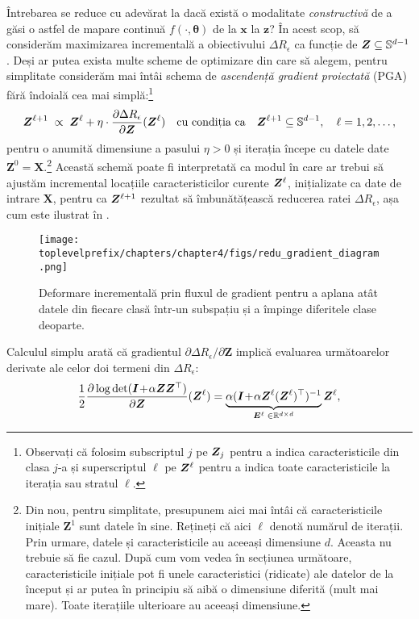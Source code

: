\documentclass[../../book-main_ro.tex]{subfiles}
\begin{document}
Întrebarea se reduce cu adevărat la dacă există o modalitate {\em constructivă} de a găsi o astfel de mapare continuă $f(\cdot,\bm \theta)$ de la $\bm x$ la $\bm z$? În acest scop, să considerăm maximizarea incrementală a obiectivului $\Delta R_{\epsilon}$ ca funcție de $\bm{Z} \subseteq \mathbb{S}^{d-1}$. Deși ar putea exista multe scheme de optimizare din care să alegem, pentru simplitate considerăm mai întâi schema de {\em ascendență gradient proiectată} (PGA) fără îndoială cea mai simplă:\footnote{Observați că folosim subscriptul $j$ pe $\bm{Z}_j$ pentru a indica caracteristicile din clasa $j$-a și superscriptul $\ell$ pe $\bm{Z}^{\ell}$ pentru a indica toate caracteristicile la iterația sau stratul $\ell$.} 
\begin{equation}
\bm Z^{\ell+1}   \; \propto \; \bm Z^{\ell} + \eta \cdot \frac{\partial \Delta R_{\epsilon}}{\partial \bm Z}(\bm{Z}^{\ell})
\quad \mbox{cu condiția ca} \quad \bm{Z}^{\ell+1} \subseteq \mathbb{S}^{d-1}, \quad \ell = 1, 2, \ldots,
\label{eqn:gradient-descent}
\end{equation}
pentru o anumită dimensiune a pasului $\eta >0$ și iterația începe cu datele date $\bm Z^{0} = \bm X$.\footnote{Din nou, pentru simplitate, presupunem aici mai întâi că caracteristicile inițiale $\bm Z^{1}$ sunt datele în sine. Rețineți că aici $\ell$ denotă numărul de iterații. Prin urmare, datele și caracteristicile au aceeași dimensiune $d$. Aceasta nu trebuie să fie cazul. După cum vom vedea în secțiunea următoare, caracteristicile inițiale pot fi unele caracteristici (ridicate) ale datelor de la început și ar putea în principiu să aibă o dimensiune diferită (mult mai mare). Toate iterațiile ulterioare au aceeași dimensiune.}
Această schemă poate fi interpretată ca modul în care ar trebui să ajustăm incremental locațiile caracteristicilor curente $\bm{Z}^\ell$, inițializate ca date de intrare $\bm X$, pentru ca $\bm{Z}^{\ell +1}$ rezultat să îmbunătățească reducerea ratei $\Delta R_{\epsilon}$, așa cum este ilustrat în . 
\begin{figure}
\centering
    \texttt{[image: \\toplevelprefix/chapters/chapter4/figs/redu\_gradient\_diagram.png]} 
    \caption{Deformare incrementală prin fluxul de gradient pentru a aplana atât datele din fiecare clasă într-un subspațiu și a împinge diferitele clase deoparte.} 
    \label{fig:gradient-flow}
\end{figure} 


Calculul simplu arată că gradientul ${\partial \Delta R_{\epsilon}}/{\partial \bm Z}$ implică evaluarea următoarelor derivate ale celor doi termeni din $\Delta R_{\epsilon}$:
\begin{equation}\label{eqn:expand-directions}
    \frac{1}{2}\frac{\partial \log \det (\bm{I} \!+\! \alpha \bm{Z} \bm{Z}^{\top} )}{\partial \bm Z}(\bm{Z}^\ell) = \underbrace{\alpha(\bm{I} \!+\! \alpha\bm{Z}^\ell (\bm{Z}^\ell)^\top)^{-1}}_{\bm E^{\ell} \; \in \mathbb{R}^{d\times d}}\bm{Z}^\ell,
\end{equation}
\end{document}
